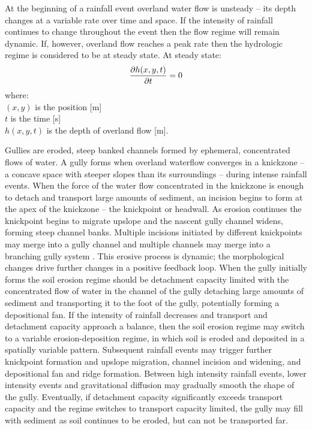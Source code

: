 \documentclass[gmd, manuscript]{copernicus}
\begin{document}
At the beginning of a rainfall event 
overland water flow is unsteady -- 
its depth changes at a variable rate over time and space. 
If the intensity of rainfall continues to change throughout the event
then the flow regime will remain dynamic. 
If, however, overland flow reaches a peak rate
then the hydrologic regime is considered to be at steady state.
At steady state:
\begin{equation}
\label{eq:steady_state}
{\partial h(x,y,t) \over \partial t} = 0
\end{equation}
%
{\small
\noindent
where: \\
\noindent
\hspace*{0.5em} $(x,y)$ is the position [\unit{m}]\\
\hspace*{0.5em} $t$ is the time [\unit{s}]\\
\hspace*{0.5em} $h(x,y,t)$ is the depth of overland flow [\unit{m}].\\
}

Gullies are eroded, steep banked channels 
formed by ephemeral, concentrated flows of water.
A gully forms when overland waterflow
converges in a knickzone
-- a concave space with steeper slopes than its surroundings 
\citep{Zahra2017} -- 
during intense rainfall events.  
When the force of the water flow concentrated in the knickzone
is enough to detach and transport large amounts of sediment,
an incision begins to form at the apex of the knickzone 
-- the knickpoint or headwall.
As erosion continues the knickpoint begins to migrate upslope
and the nascent gully channel widens,
forming steep channel banks. 
Multiple incisions initiated by different knickpoints 
may merge into a gully channel
and multiple channels may merge 
into a branching gully system \citep{Mitasova2013}. 
This erosive process is dynamic; 
the morphological changes drive further changes 
in a positive feedback loop.
When the gully initially forms 
the soil erosion regime should be detachment capacity limited
with the concentrated flow of water in the channel of the gully 
detaching large amounts of sediment 
and transporting it to the foot of the gully, 
potentially forming a depositional fan.
If the intensity of rainfall decreases
and transport and detachment capacity 
approach a balance, 
then the soil erosion regime may switch to 
a variable erosion-deposition regime,
in which soil is eroded and deposited 
in a spatially variable pattern.
Subsequent rainfall events may trigger further 
knickpoint formation and upslope migration, 
channel incision and widening, and
depositional fan and ridge formation. 
Between high intensity rainfall events, 
lower intensity events and gravitational diffusion
may gradually smooth the shape of the gully. 
Eventually, if detachment capacity 
significantly exceeds transport capacity
and the regime switches to transport capacity limited, 
the gully may fill with sediment
as soil continues to be eroded, 
but can not be transported far. 
\end{document}
